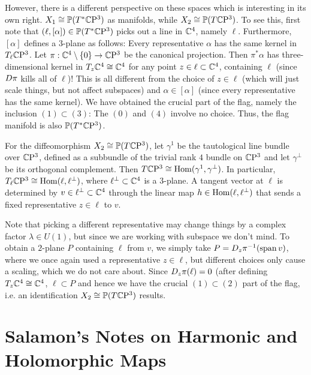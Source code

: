 \documentclass{scrartcl}
\begin{document}
\medskip

However, there is a different perspective on these spaces which is interesting in its own right. $X_1\cong \mathbb{P}(T^*\mathbb{C}\mathrm{P}^3)$ as manifolds, while $X_2\cong \mathbb{P}(T\mathbb{C}\mathrm{P}^3)$. To see this, first note that $(\ell,[\alpha])\in \mathbb{P}(T^*\mathbb{C}\mathrm{P}^3)$ picks out a line in $\mathbb{C}^4$, namely $\ell$. Furthermore, $[\alpha]$ defines a $3$-plane as follows: Every representative $\alpha$ has the same kernel in $T_\ell \mathbb{C}\mathrm{P}^3$. Let $\pi:\mathbb{C}^4\setminus \{0\}\to \mathbb{C}\mathrm{P}^3$ be the canonical projection. Then $\pi^*\alpha$ has three-dimensional kernel in $T_z\mathbb{C}^4\cong \mathbb{C}^4$ for any point $z\in \ell\subset \mathbb{C}^4$, containing $\ell$ (since $D \pi$ kills all of $\ell$)! This is all different from the choice of $z\in\ell$ (which will just scale things, but not affect subspaces) and $\alpha\in[\alpha]$ (since every representative has the same kernel). We have obtained the crucial part of the flag, namely the inclusion $(1)\subset (3)$: The $(0)$ and $(4)$ involve no choice. Thus, the flag manifold is also $\mathbb{P}(T^*\mathbb{C}\mathrm{P}^3)$.

\medskip

For the diffeomorphism $X_2\cong \mathbb{P}(T\mathbb{C}\mathrm{P}^3)$, let $\gamma^1$ be the tautological line bundle over $\mathbb{C}\mathrm{P}^3$, defined as a subbundle of the trivial rank $4$ bundle on $\mathbb{C}\mathrm{P}^3$ and let $\gamma^\perp$ be its orthogonal complement. Then $T\mathbb{C}\mathrm{P}^3\cong \operatorname{Hom}(\gamma^1,\gamma^\perp)$. In particular, $T_\ell \mathbb{C}\mathrm{P}^3\cong \operatorname{Hom}(\ell,\ell^\perp)$, where $\ell^\perp\subset \mathbb{C}^4$ is a $3$-plane. A tangent vector at $\ell$ is determined by $v\in\ell^\perp\subset\mathbb{C}^4$ through the linear map $h\in\operatorname{Hom}(\ell,\ell^\perp)$ that sends a fixed representative $z\in\ell$ to $v$. 

\medskip

Note that picking a different representative may change things by a complex factor $\lambda\in U(1)$, but since we are working with subspace we don't mind. To obtain a $2$-plane $P$ containing $\ell$ from $v$, we simply take $P=D_z\pi^{-1}(\operatorname{span} v)$, where we once again used a representative $z\in\ell$, but different choices only cause a scaling, which we do not care about. Since $D_z\pi(\ell)=0$ (after defining $T_z\mathbb{C}^4\cong \mathbb{C}^4$, $\ell\subset P$ and hence we have the crucial $(1)\subset (2)$ part of the flag, i.e. an identification $X_2\cong \mathbb{P}(T\mathbb{C}\mathrm{P}^3)$ results.

\section{Salamon's Notes on Harmonic and Holomorphic Maps}
\end{document}
